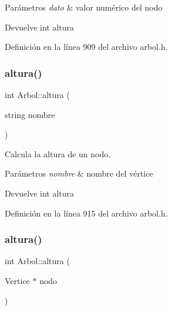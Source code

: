 \begin{DoxyParams}{Parámetros}
{\em dato} & valor numérico del nodo \\
\hline
\end{DoxyParams}
\begin{DoxyReturn}{Devuelve}
int altura 
\end{DoxyReturn}


Definición en la línea 909 del archivo arbol.\+h.

\mbox{\label{classArbol_a7a79cb43ca30b5120f1a8ebe3afbe22c}} 
\subsubsection{\texorpdfstring{altura()}{altura()}\hspace{0.1cm}{\footnotesize\ttfamily [2/3]}}
{\footnotesize\ttfamily int Arbol\+::altura (\begin{DoxyParamCaption}\item[{string}]{nombre }\end{DoxyParamCaption})}



Calcula la altura de un nodo. 


\begin{DoxyParams}{Parámetros}
{\em nombre} & nombre del vértice \\
\hline
\end{DoxyParams}
\begin{DoxyReturn}{Devuelve}
int altura 
\end{DoxyReturn}


Definición en la línea 915 del archivo arbol.\+h.

\mbox{\label{classArbol_a9f8928b4c72e2d484ef75cf3633c22ce}} 
\subsubsection{\texorpdfstring{altura()}{altura()}\hspace{0.1cm}{\footnotesize\ttfamily [3/3]}}
{\footnotesize\ttfamily int Arbol\+::altura (\begin{DoxyParamCaption}\item[{Vertice $\ast$}]{nodo }\end{DoxyParamCaption})}



